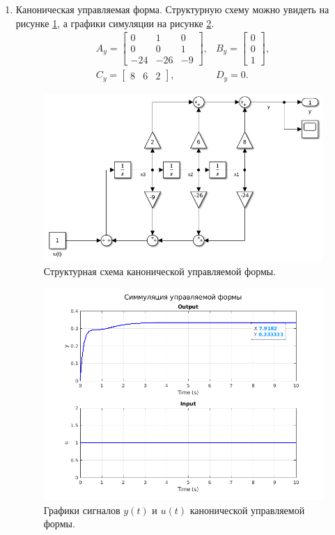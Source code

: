 \begin{enumerate}
    \item Каноническая управляемая форма. Структурную схему можно увидеть
    на рисунке \ref{fig:task2_slx_ctrl}, а графики симуляции на рисунке 
    \ref{fig:task2_out_ctrl_y}.
\begin{equation*}
    \begin{array}{cc}
        A_y=\begin{bmatrix}
            0 & 1 & 0 \\
            0 & 0 & 1 \\
            -24 & -26 & -9
        \end{bmatrix}, &
        B_y=\begin{bmatrix}
            0 \\ 0 \\ 1
        \end{bmatrix}, \\[7mm]
        C_y=\begin{bmatrix}
            8 & 6 & 2
        \end{bmatrix}, &
        D_y=0.
    \end{array}
\end{equation*}
\begin{figure}[htbp]
    \centering
    \includegraphics[width=0.8\linewidth]{figs/task_2_slx_ctrl.png}
    \caption{Структурная схема канонической управляемой формы.}
    \label{fig:task2_slx_ctrl}
\end{figure}
\begin{figure}[htbp]
    \centering
    \includegraphics[width=0.9\linewidth]{figs/task_2_out_ctrl_y.png}
    \caption{Графики сигналов $y(t)$ и $u(t)$ канонической управляемой формы.}
    \label{fig:task2_out_ctrl_y}
\end{figure}


\end{enumerate}
